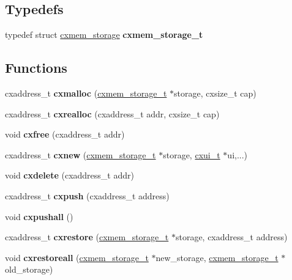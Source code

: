 \subsection*{Typedefs}
\begin{DoxyCompactItemize}
\item 
\mbox{\label{a00017_aace66181c4f439c1f67b868f3e930ec1}} 
typedef struct \hyperlink{a00056}{cxmem\+\_\+storage} {\bfseries cxmem\+\_\+storage\+\_\+t}
\end{DoxyCompactItemize}
\subsection*{Functions}
\begin{DoxyCompactItemize}
\item 
\mbox{\label{a00017_a79f881f6b5d0e7240669c94efdd9a1fe}} 
cxaddress\+\_\+t {\bfseries cxmalloc} (\hyperlink{a00056}{cxmem\+\_\+storage\+\_\+t} $\ast$storage, cxsize\+\_\+t cap)
\item 
\mbox{\label{a00017_ad0e71c095779be36c9f1b59bdb046ce3}} 
cxaddress\+\_\+t {\bfseries cxrealloc} (cxaddress\+\_\+t addr, cxsize\+\_\+t cap)
\item 
\mbox{\label{a00017_aa385ca512cff4b8c301e8a53433717ef}} 
void {\bfseries cxfree} (cxaddress\+\_\+t addr)
\item 
\mbox{\label{a00017_ad54d278ec209a424cadf8f9fadb12a16}} 
cxaddress\+\_\+t {\bfseries cxnew} (\hyperlink{a00056}{cxmem\+\_\+storage\+\_\+t} $\ast$storage, \hyperlink{a00076}{cxui\+\_\+t} $\ast$ui,...)
\item 
\mbox{\label{a00017_a3db54ac7c72f2bc05eebe2d4a1af5ba1}} 
void {\bfseries cxdelete} (cxaddress\+\_\+t addr)
\item 
\mbox{\label{a00017_a82077f7f1f9c7357eab44f2723a5d4b0}} 
cxaddress\+\_\+t {\bfseries cxpush} (cxaddress\+\_\+t address)
\item 
\mbox{\label{a00017_a88798e8e4491762a9ca0f5b7024a8d4d}} 
void {\bfseries cxpushall} ()
\item 
\mbox{\label{a00017_abf00dae1b2b6acb3018f47db17101a3c}} 
cxaddress\+\_\+t {\bfseries cxrestore} (\hyperlink{a00056}{cxmem\+\_\+storage\+\_\+t} $\ast$storage, cxaddress\+\_\+t address)
\item 
\mbox{\label{a00017_a00ca5fd486c44a30fd7632301e9a20b0}} 
void {\bfseries cxrestoreall} (\hyperlink{a00056}{cxmem\+\_\+storage\+\_\+t} $\ast$new\+\_\+storage, \hyperlink{a00056}{cxmem\+\_\+storage\+\_\+t} $\ast$old\+\_\+storage)
\end{DoxyCompactItemize}
